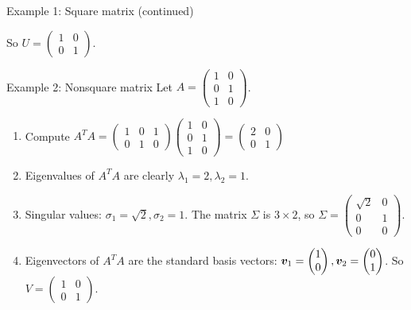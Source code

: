 \documentclass[aspectratio=169]{beamer}\usepackage[]{graphicx}\usepackage[]{xcolor}
\begin{document}
\begin{frame}{Example 1: Square matrix (continued)}
\begin{enumerate}
\begin{itemize}
\end{itemize}
So $U = \begin{pmatrix} 1 & 0 \\ 0 & 1 \end{pmatrix}$.
\end{enumerate}
\end{frame}


\begin{frame}{Example 2: Nonsquare matrix}
Let $A = \begin{pmatrix} 1 & 0 \\ 0 & 1 \\ 1 & 0 \end{pmatrix}$.
\vfill
\begin{enumerate}
\item Compute $A^TA = \begin{pmatrix} 1 & 0 & 1 \\ 0 & 1 & 0 \end{pmatrix}\begin{pmatrix} 1 & 0 \\ 0 & 1 \\ 1 & 0 \end{pmatrix} = \begin{pmatrix} 2 & 0 \\ 0 & 1 \end{pmatrix}$
\item Eigenvalues of $A^TA$ are clearly $\lambda_1=2, \lambda_2=1$.
\item Singular values: $\sigma_1=\sqrt{2}, \sigma_2=1$. The matrix $\Sigma$ is $3 \times 2$, so $\Sigma = \begin{pmatrix} \sqrt{2} & 0 \\ 0 & 1 \\ 0 & 0 \end{pmatrix}$.
\item Eigenvectors of $A^TA$ are the standard basis vectors: $\bm{v}_1 = \begin{pmatrix} 1 \\ 0 \end{pmatrix}, \bm{v}_2 = \begin{pmatrix} 0 \\ 1 \end{pmatrix}$. So $V = \begin{pmatrix} 1 & 0 \\ 0 & 1 \end{pmatrix}$.
\end{enumerate}
\end{frame}
\end{document}
